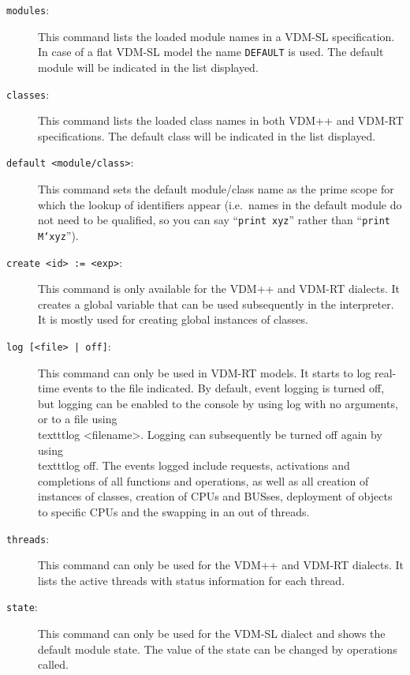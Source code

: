 \documentclass{overturerep}
\begin{document}
{\begin{description}
\item[\texttt{modules}:] This command lists the loaded module names in
  a VDM-SL specification. In case of a flat VDM-SL model the name
  \texttt{DEFAULT} is used. The default module will be indicated in
  the list displayed.
\item[\texttt{classes}:] This command lists the loaded class names in
  both VDM++ and VDM-RT specifications. The default class will be indicated in
  the list displayed.
\item[\texttt{default <module/class>}:] This command sets the default
  module/class name as the prime scope for which the lookup of
  identifiers appear (i.e.\ names in the default module
do not need to be qualified, so you can say ``\texttt{print xyz}'' rather than
``\texttt{print M`xyz}'').
\item[\texttt{create <id> := <exp>}:] This command is only available
  for the VDM++ and VDM-RT dialects. It creates a global variable that
  can be used subsequently in the interpreter. It is mostly used for
  creating global instances of classes. 
\item[\texttt{log [<file> | off]}:] This command can only be used in
  VDM-RT models. It starts to log real-time events to the file indicated. By
  default, event logging is turned off, but logging can be enabled to
  the console by using log with no arguments, or to a file using \\texttt{log
  <filename>}. Logging can subsequently be turned off again by using
  \\texttt{log off}. The events logged include requests, activations and
  completions of all functions and operations, as well as all creation
  of instances of classes, creation of CPUs and BUSses, deployment of objects
  to specific CPUs and the swapping in an out of threads.  
\item[\texttt{threads}:] This command can only be used for the VDM++
  and VDM-RT dialects. It lists the active threads with status
  information for each thread. 
\item[\texttt{state}:] This command can only be used for the VDM-SL
  dialect and shows the default module state.  
  The value of the state can be changed by operations called.

\end{description}}
\end{document}
